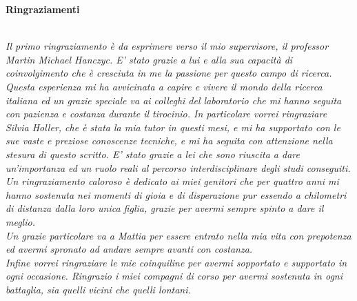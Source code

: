 \thispagestyle{empty}

\begin{center}
  {\bf \Huge Ringraziamenti}
\end{center}

\vspace{4cm}


\emph{
\\Il primo ringraziamento è da esprimere verso il mio supervisore, il professor Martin Michael Hanczyc. E' stato grazie a lui e alla sua capacità di coinvolgimento che è cresciuta in me la passione per questo campo di ricerca. 
\\Questa esperienza mi ha avvicinata a capire e vivere il mondo della ricerca italiana ed un grazie speciale va ai colleghi del laboratorio che mi hanno seguita con pazienza e costanza durante il tirocinio. In particolare vorrei ringraziare Silvia Holler, che è stata la mia tutor in questi mesi, e mi ha supportato con le sue vaste e preziose conoscenze tecniche, e mi ha seguita con attenzione nella stesura di questo scritto. E' stato grazie a lei che sono riuscita a dare un'importanza ed un ruolo reali al percorso interdisciplinare degli studi conseguiti.
\\Un ringraziamento caloroso è dedicato ai miei genitori che per quattro anni mi hanno sostenuta nei momenti di gioia e di disperazione pur essendo a chilometri di distanza dalla loro unica figlia, grazie per avermi sempre spinto a dare il meglio.
\\Un grazie particolare va a Mattia per essere entrato nella mia vita con prepotenza ed avermi spronato ad andare sempre avanti con costanza.
\\Infine vorrei ringraziare le mie coinquiline per avermi sopportato e supportato in ogni occasione. Ringrazio i miei compagni di corso per avermi sostenuta in ogni battaglia, sia quelli vicini che quelli lontani.       
}
